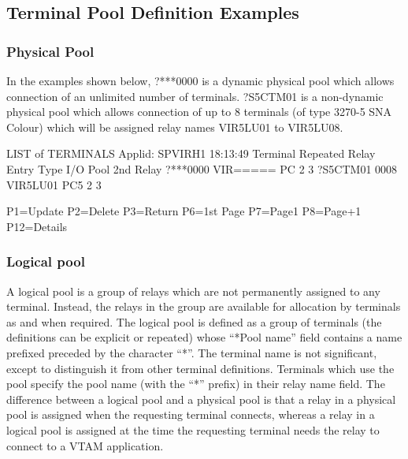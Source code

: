 \documentclass[letterpaper,10pt,english]{sphinxmanual}
\begin{document}
\subsection{Terminal Pool Definition Examples}
\label{\detokenize{connectivity_guide:terminal-pool-definition-examples}}\label{\detokenize{connectivity_guide:index-142}}

\subsubsection{Physical Pool}
\label{\detokenize{connectivity_guide:physical-pool}}
In the examples shown below, ?***0000 is a dynamic physical pool which allows connection of an unlimited number of terminals. ?S5CTM01 is a non-dynamic physical pool which allows connection of up to 8 terminals (of type 3270-5 SNA Colour) which will be assigned relay names VIR5LU01 to VIR5LU08.

\begin{sphinxVerbatim}[commandchars=\\\{\}]
LIST of TERMINALS \PYGZhy{}\PYGZhy{}\PYGZhy{}\PYGZhy{}\PYGZhy{}\PYGZhy{}\PYGZhy{}\PYGZhy{}\PYGZhy{}\PYGZhy{}\PYGZhy{}\PYGZhy{}\PYGZhy{}\PYGZhy{}\PYGZhy{}\PYGZhy{}\PYGZhy{}\PYGZhy{}\PYGZhy{}\PYGZhy{}\PYGZhy{}\PYGZhy{}\PYGZhy{}\PYGZhy{}\PYGZhy{}\PYGZhy{}\PYGZhy{}\PYGZhy{}\PYGZhy{}\PYGZhy{}\PYGZhy{}\PYGZhy{}\PYGZhy{}\PYGZhy{} Applid: SPVIRH1 18:13:49
Terminal Repeated   Relay    Entry   Type I/O Pool 2nd Relay
?***0000            VIR===== PC      2    3
?S5CTM01 0008       VIR5LU01 PC5     2    3


P1=Update           P2=Delete        P3=Return         P6=1st Page
P7=Page\PYGZhy{}1           P8=Page+1        P12=Details
\end{sphinxVerbatim}



\subsubsection{Logical pool}
\label{\detokenize{connectivity_guide:v457cn-logicalpool}}\label{\detokenize{connectivity_guide:logical-pool}}
A logical pool is a group of relays which are not permanently assigned to any terminal. Instead, the relays in the group are available for allocation by terminals as and when required. The logical pool is defined as a group of terminals (the definitions can be explicit or repeated) whose “*Pool name” field contains a name prefixed preceded by the character “*”. The terminal name is not significant, except to distinguish it from other terminal definitions. Terminals which use the pool specify the pool name (with the “*” prefix) in their relay name field. The difference between a logical pool and a physical pool is that a relay in a physical pool is assigned when the requesting terminal connects, whereas a relay in a logical pool is assigned at the time the requesting terminal needs the relay to connect to a VTAM application.
\end{document}

